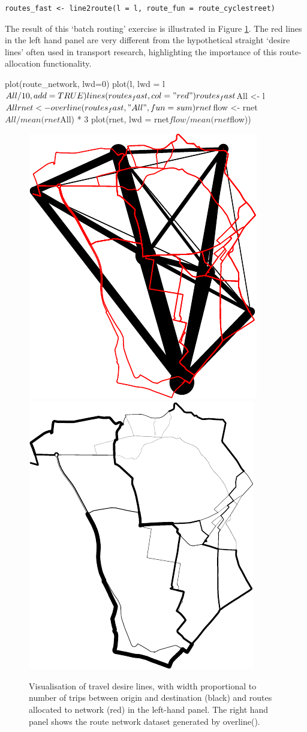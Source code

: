 \begin{verbatim}
routes_fast <- line2route(l = l, route_fun = route_cyclestreet)
\end{verbatim}

The result of this `batch routing' exercise is illustrated in Figure
\ref{fig:lines_routes}. The red lines in the left hand panel are very
different from the hypothetical straight `desire lines' often used in
transport research, highlighting the importance of this route-allocation
functionality.

\begin{Schunk}
\begin{Sinput}
plot(route_network, lwd=0)
plot(l, lwd = l$All / 10, add = TRUE)
lines(routes_fast, col = "red")
routes_fast$All <- l$All
rnet <- overline(routes_fast, "All", fun = sum)
rnet$flow <- rnet$All / mean(rnet$All) * 3
plot(rnet, lwd = rnet$flow / mean(rnet$flow))
\end{Sinput}
\begin{figure}
\includegraphics[width=0.5\linewidth]{lines_routes-1} \includegraphics[width=0.5\linewidth]{lines_routes-2} \caption[Visualisation of travel desire lines, with width proportional to number of trips between origin and destination (black) and routes allocated to network  (red) in the left-hand panel]{Visualisation of travel desire lines, with width proportional to number of trips between origin and destination (black) and routes allocated to network  (red) in the left-hand panel. The right hand panel shows the route network dataset generated by overline().}\label{fig:lines_routes}
\end{figure}
\end{Schunk}

